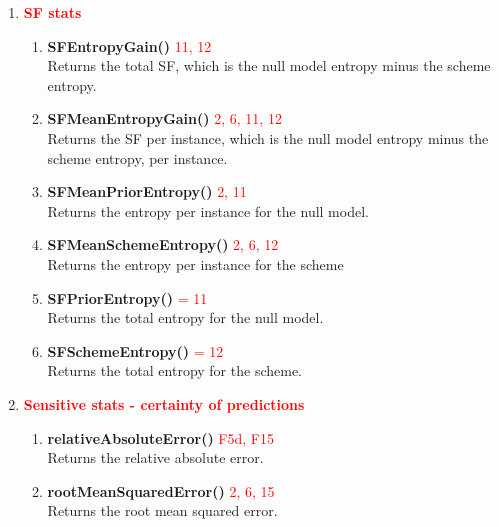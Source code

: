 \documentclass[a4paper,12pt]{article}
\begin{document}
\begin{enumerate}
\item \textbf{\textcolor{red}{SF stats}}
\begin{enumerate}
              
\item \textbf{SFEntropyGain()} \textcolor{red}{11, 12}
        \\  Returns the total SF, which is the null model entropy minus the scheme entropy.    
          

\item \textbf{SFMeanEntropyGain()} \textcolor{red}{2, 6, 11, 12}
        \\  Returns the SF per instance, which is the null model entropy minus the scheme entropy, per instance.         
          

\item \textbf{SFMeanPriorEntropy()} \textcolor{red}{2, 11}
         \\ Returns the entropy per instance for the null model.       
          
\item \textbf{SFMeanSchemeEntropy()} \textcolor{red}{2, 6, 12}
         \\ Returns the entropy per instance for the scheme        

 
\item \textbf{SFPriorEntropy()} \textcolor{red}{= 11}
        \\  Returns the total entropy for the null model.
          
\item \textbf{SFSchemeEntropy()} \textcolor{red}{= 12}
         \\ Returns the total entropy for the scheme. 

\end{enumerate}



\item \textbf{\textcolor{red}{Sensitive stats - certainty of predictions}}
\begin{enumerate}

\item \textbf{relativeAbsoluteError()} \textcolor{red}{F5d, F15}
        \\  Returns the relative absolute error. 

\item \textbf{rootMeanSquaredError()} \textcolor{red}{2, 6, 15}
         \\ Returns the root mean squared error.           


\end{enumerate}
\end{enumerate}
\end{document}
